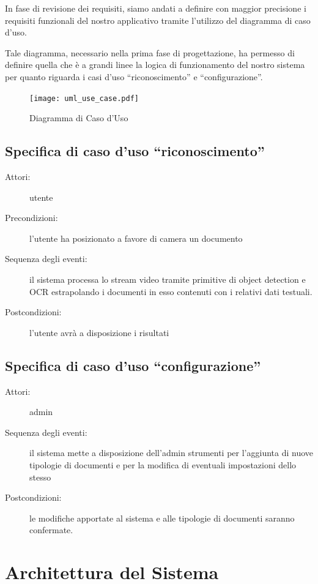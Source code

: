 \documentclass[12pt,a4paper]{article}
\begin{document}
In fase di revisione dei requisiti, siamo andati a definire con maggior
precisione i requisiti funzionali del nostro applicativo tramite
l'utilizzo del diagramma di caso d'uso.

Tale diagramma, necessario nella prima fase di progettazione, ha
permesso di definire quella che è a grandi linee la logica di
funzionamento del nostro
sistema per quanto riguarda i casi d'uso ``riconoscimento'' e ``configurazione''.

\begin{figure}[H]
    \caption{Diagramma di Caso d'Uso}
    \centering
    \texttt{[image: uml\_use\_case.pdf]}
\end{figure}

\subsection{Specifica di caso d'uso ``riconoscimento''}
\begin{description}
    \item[Attori:] utente
    \item[Precondizioni:] l'utente ha posizionato a favore di camera un
        documento
    \item[Sequenza degli eventi:] il sistema processa lo stream video
        tramite primitive di object detection e OCR estrapolando i
        documenti in esso contenuti con i relativi dati testuali.
    \item[Postcondizioni:] l'utente avrà a disposizione i risultati
\end{description}

\subsection{Specifica di caso d'uso ``configurazione''}
\begin{description}
    \item[Attori:] admin
    \item[Sequenza degli eventi:] il sistema mette a disposizione
        dell'admin strumenti per l'aggiunta di nuove tipologie di
        documenti e per la modifica di eventuali impostazioni dello
        stesso
    \item[Postcondizioni:] le modifiche apportate al sistema e alle
        tipologie di documenti saranno confermate.
\end{description}

\section{Architettura del Sistema}
\end{document}
